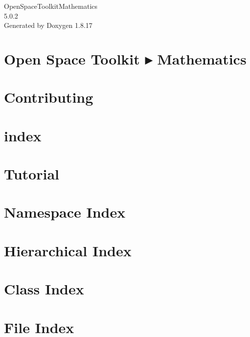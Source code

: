 \let\mypdfximage\pdfximage\def\pdfximage{\immediate\mypdfximage}\documentclass[twoside]{book}
\newcommand{\+}{\discretionary{\mbox{\scriptsize$\hookleftarrow$}}{}{}}
\newcommand{\clearemptydoublepage}{%
  \newpage{\pagestyle{empty}\cleardoublepage}%
}
\begin{document}
\hypersetup{pageanchor=false,
             bookmarksnumbered=true,
             pdfencoding=unicode
            }
\begin{titlepage}
\vspace*{7cm}
\begin{center}%
{\Large Open\+Space\+Toolkit\+Mathematics \\[1ex]\large 5.\+0.\+2 }\\
\vspace*{1cm}
{\large Generated by Doxygen 1.8.17}\\
\end{center}
\end{titlepage}
\clearemptydoublepage
{}
\tableofcontents
\clearemptydoublepage
{}
\hypersetup{pageanchor=true}

\chapter{Open Space Toolkit ▸ Mathematics}
\label{index}\hypertarget{index}{}
\chapter{Contributing}
\label{md__c_o_n_t_r_i_b_u_t_i_n_g}

\chapter{index}
\label{md_docs_index}

\chapter{Tutorial}
\label{md_docs__tutorial}

\chapter{Namespace Index}

\chapter{Hierarchical Index}

\chapter{Class Index}

\chapter{File Index}

\end{document}
